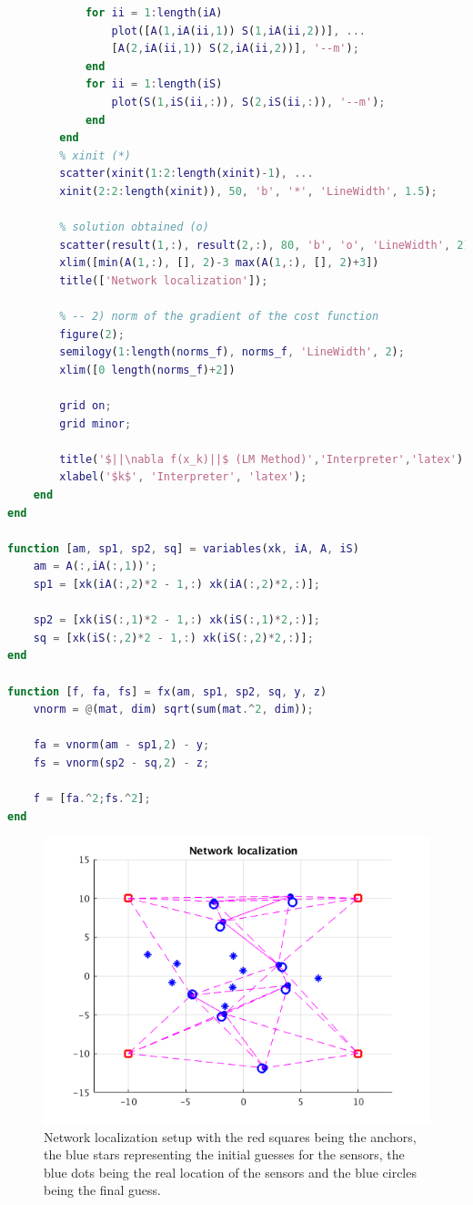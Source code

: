 \begin{lstlisting}[language=Matlab, caption=Matlab code for task 8., label=listing:task8:lm]
            % pink lines
            for ii = 1:length(iA)
                plot([A(1,iA(ii,1)) S(1,iA(ii,2))], ...
                [A(2,iA(ii,1)) S(2,iA(ii,2))], '--m');
            end
            for ii = 1:length(iS)
                plot(S(1,iS(ii,:)), S(2,iS(ii,:)), '--m');
            end
        end
        % xinit (*)
        scatter(xinit(1:2:length(xinit)-1), ...
        xinit(2:2:length(xinit)), 50, 'b', '*', 'LineWidth', 1.5);

        % solution obtained (o)
        scatter(result(1,:), result(2,:), 80, 'b', 'o', 'LineWidth', 2);
        xlim([min(A(1,:), [], 2)-3 max(A(1,:), [], 2)+3])
        title(['Network localization']);
        
        % -- 2) norm of the gradient of the cost function
        figure(2);
        semilogy(1:length(norms_f), norms_f, 'LineWidth', 2);
        xlim([0 length(norms_f)+2])

        grid on;
        grid minor;

        title('$||\nabla f(x_k)||$ (LM Method)','Interpreter','latex')
        xlabel('$k$', 'Interpreter', 'latex');
    end
end

function [am, sp1, sp2, sq] = variables(xk, iA, A, iS)
    am = A(:,iA(:,1))';    
    sp1 = [xk(iA(:,2)*2 - 1,:) xk(iA(:,2)*2,:)];

    sp2 = [xk(iS(:,1)*2 - 1,:) xk(iS(:,1)*2,:)];    
    sq = [xk(iS(:,2)*2 - 1,:) xk(iS(:,2)*2,:)];
end

function [f, fa, fs] = fx(am, sp1, sp2, sq, y, z)
    vnorm = @(mat, dim) sqrt(sum(mat.^2, dim));

    fa = vnorm(am - sp1,2) - y;
    fs = vnorm(sp2 - sq,2) - z;

    f = [fa.^2;fs.^2];
end
\end{lstlisting}

\begin{figure}[H]
    \centering    
    \includegraphics[width=0.6\linewidth]{part2/figures/task8_netloc.png}
    \caption{Network localization setup with the red squares being the anchors, the blue stars representing the initial guesses for the sensors, the blue dots being the real location of the sensors and the blue circles being the final guess.}
    \label{fig:task8:netloc}
\end{figure}

